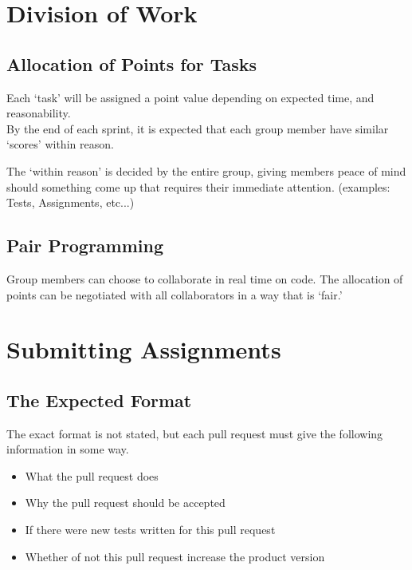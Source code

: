 \documentclass[hidelinks, 12pt]{article}    %
\begin{document}
    \section{Division of Work}
        \subsection{Allocation of Points for Tasks}
            Each `task' will be assigned a point value depending on expected time, and reasonability. \\
            By the end of each sprint, it is expected that each group member have similar `scores' within reason.

            The `within reason' is decided by the entire group, giving members peace of mind should something come
            up that requires their immediate attention. (examples: Tests, Assignments, etc...)

        \subsection{Pair Programming}
            Group members can choose to collaborate in real time on code. The allocation of points can be
            negotiated with all collaborators in a way that is `fair.' 

    \section{Submitting Assignments}
        \subsection{The Expected Format}
            The exact format is not stated, but each pull request must give the following information in some way. \\

            \begin{itemize}
                \item What the pull request does
                \item Why the pull request should be accepted
                \item If there were new tests written for this pull request
                \item Whether of not this pull request increase the product version
            \end{itemize}
            
    \pagebreak
\end{document}

